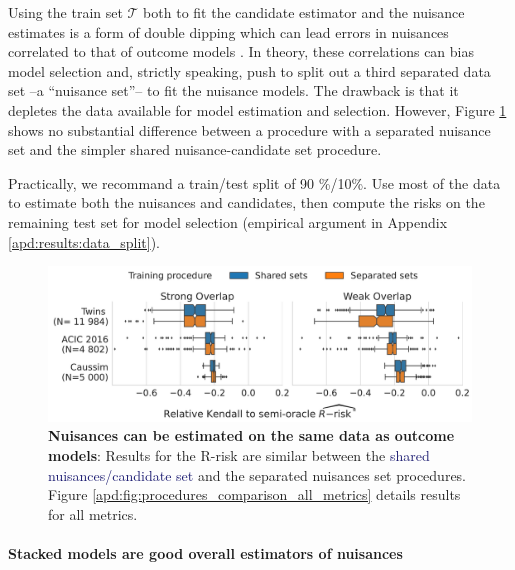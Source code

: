 \documentclass[10pt,twocolumn]{article}
\begin{document}
Using the train set $\mathcal{T}$ both to fit the candidate estimator and the
nuisance estimates is a form of double dipping which can lead errors in
nuisances correlated to that of outcome models
\cite{nie_quasioracle_2017}. In theory, these correlations can bias model
selection and, strictly speaking, push
to split out a third separated data set --a ``nuisance set''-- to fit the
nuisance models. The drawback is that it depletes the data available for
model estimation and selection. However, Figure
\ref{fig:procedures_comparison} shows no substantial difference between a procedure with a separated
nuisance set and the simpler shared nuisance-candidate set procedure.

Practically, we recommand a train/test split of 90 \%/10\%. Use most of the data
to estimate both the nuisances and candidates, then compute the risks on the
remaining test set for model selection (empirical argument in Appendix
\ref{apd:results:data_split}).

\begin{figure}[!tb]
    \includegraphics[width=\linewidth]{images/_3_procedure_r_risk_only_3datasets_twocols.pdf}

    \caption{\textbf{Nuisances can be estimated on the same data as outcome
            models}: Results for the R-risk are similar between the
        \textcolor{MidnightBlue}{shared
            nuisances/candidate set} and
        the \textcolor{RedOrange}{separated nuisances set} procedures. Figure
        \ref{apd:fig:procedures_comparison_all_metrics} details results for all metrics.}\label{fig:procedures_comparison}
\end{figure}

\paragraph{Stacked models are good overall estimators of nuisances}
\end{document}
